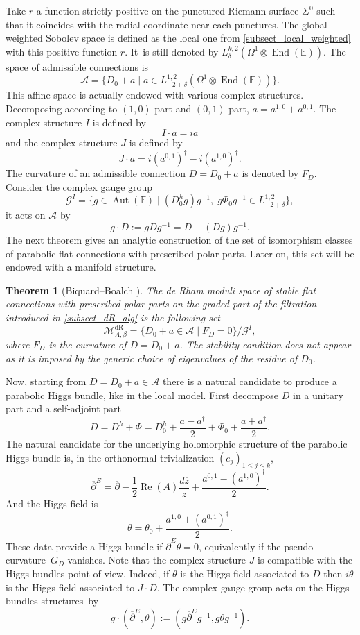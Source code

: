 \documentclass[JEP,XML,SOM,NoEqCountersInSection,Unicode,published]{cedram}
\newcommand{\dR}{\mathrm{dR}}
\theoremstyle{definition}
\theoremstyle{plain}
\newtheorem{theorem}[definition]{Theorem}
\DeclareMathOperator{\End}{End}
\DeclareMathOperator{\Aut}{Aut}
\DeclareMathOperator{\Ree}{Re}
\newcommand{\inv}{^{-1}}
\begin{document}
Take $r$ a function strictly positive on the punctured Riemann surface $\Sigma^0$ such that it coincides with the radial coordinate near each punctures. The global weighted Sobolev space is defined as the local one from \ref{subsect_local_weighted} with this positive function $r$. It~is still denoted by $L^{k,2}_{\delta}(\Omega^1\otimes \End{(\mathbb{E})})$. The space of admissible connections is
\[
\mathcal{A} =\lbrace D_0 + a \mid a \in L^{1,2}_{-2+\delta}(\Omega^1\otimes \End(\mathbb{E}))\rbrace.
\]
This affine space is actually endowed with various complex structures. Decomposing according to $(1,0)$-part and $(0,1)$-part, $a=a^{1,0}+a^{0,1}$. The complex structure $I$ is defined by
\[
I\cdot a = i a
\]
and the complex structure $J$ is defined by
\[
J\cdot a = i(a^{0,1})^{\dagger}-i(a^{1,0})^{\dagger}.
\]
The curvature of an admissible connection $D=D_0 + a$ is denoted by $F_D$. Consider the complex gauge group
\[
\mathcal{G}^I=\lbrace g\in\Aut(\mathbb{E}) \mid (D_0^h g) g\inv, \; g \Phi_0 g\inv \in L^{1,2}_{-2+\delta}\rbrace,
\]
it acts on $ \mathcal{A}$ by
\[
g\cdot D := g D g\inv = D -(D g)g\inv.
\]
The next theorem gives an analytic construction of the set of isomorphism classes of parabolic flat connections with prescribed polar parts. Later on, this set will be endowed with a manifold structure.

\begin{theorem}[Biquard--Boalch {\cite[\S8]{Biquard_Boalch_2004}}]
The de Rham moduli space of stable flat connections with prescribed polar parts on the graded part of the filtration introduced in \ref{subsect_dR_alg} is the following set
\[
\mathcal{M}^{\dR}_{A, \beta} =\lbrace D_0 + a \in \mathcal{A} \mid F_D =0\rbrace/ \mathcal{G}^{I},
\]
where $F_D$ is the curvature of $D=D_0+a$. The stability condition does not appear as it is imposed by the generic choice of eigenvalues of the residue of $D_0$.
\end{theorem}

Now, starting from $ D=D_0 +a \in \mathcal{A}$ there is a natural candidate to produce a parabolic Higgs bundle, like in the local model. First decompose $D$ in a unitary part and a self-adjoint part
\[
D =D^h + \Phi= D_0^h +\frac{a-a^{\dagger}}{2} + \Phi_0 + \frac{ a + a^{\dagger}}{2}.
\]
The natural candidate for the underlying holomorphic structure of the parabolic Higgs bundle is, in the orthonormal trivialization $(e_j)_{1\le j \le k}$,
\[
\overline{\partial}^E = \overline{\partial} - \frac{1}{2} \Ree(A) \frac{d\overline{z}}{\overline{z}} + \frac{a^{0,1}-(a^{1,0})^{\dagger}}{2}.
\]
And the Higgs field is
\[
\theta = \theta_0 + \frac{a^{1,0} + (a^{0,1})^{\dagger}}{2}.
\]
These data provide a Higgs bundle if $\overline{\partial}^E \theta =0$, equivalently if the pseudo curvature~$G_D$ vanishes. Note that the complex structure $J$ is compatible with the Higgs bundles point of view. Indeed, if $\theta$ is the Higgs field associated to $D$ then $i \theta$ is the Higgs field associated to $J\cdot D$. The complex gauge group acts on the Higgs bundles structures~by
\[
g\cdot(\overline{\partial}^E,\theta) :=(g \overline{\partial}^E g\inv,g \theta g\inv).
\]
\end{document}
